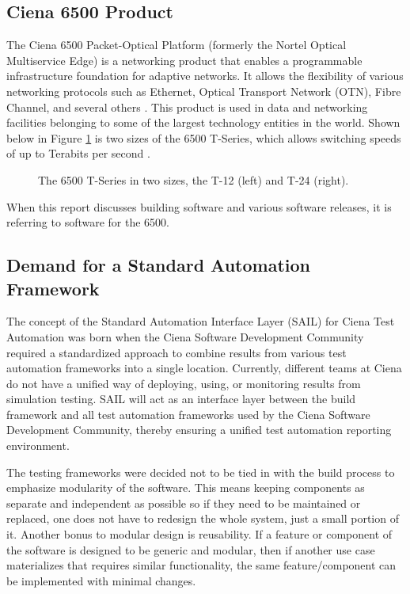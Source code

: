 \documentclass[10pt, titlepage, onecolumn, openany]{article}
\begin{document}
\subsection{Ciena 6500 Product}
The Ciena 6500 Packet-Optical Platform (formerly the Nortel Optical
Multiservice Edge) is a networking product that enables a
programmable infrastructure foundation for adaptive networks. It
allows the flexibility of various networking protocols
such as Ethernet, Optical Transport Network (OTN), Fibre Channel, and
several others \cite{6500brochure}. This product is used in data and
networking facilities belonging to some of the largest technology
entities in the world. Shown below in Figure \ref{pic6500}
is two sizes of the 6500 T-Series, which allows switching speeds of
up to Terabits per second \cite{tseries}.
\begin{figure}[H]
\centering
{}
\caption{The 6500 T-Series in two sizes, the T-12 (left) and T-24 (right).}
\label{pic6500}
\end{figure}

When this report discusses building software and various software releases, it
is referring to software for the 6500.

\subsection{Demand for a Standard Automation Framework}
The concept of the Standard Automation Interface Layer (SAIL) for Ciena Test
Automation was born when the Ciena Software Development Community required a
standardized approach to combine results from various test automation frameworks
into a single location. Currently, different teams at Ciena do not have a
unified way of deploying, using, or monitoring results from simulation testing.
SAIL will act as an interface layer between the build framework and all test
automation frameworks used by the Ciena Software Development Community, thereby
ensuring a unified test automation reporting environment.

The testing frameworks were decided not to be tied in with the build process to
emphasize modularity of the software. This means keeping components as separate
and independent as possible so if they need to be maintained or replaced, one
does not have to redesign the whole system, just a small portion of it. Another
bonus to modular design is reusability. If a feature or component of the
software is designed to be generic and modular, then if another use case
materializes that requires similar functionality, the same feature/component can
be implemented with minimal changes.
\end{document}
